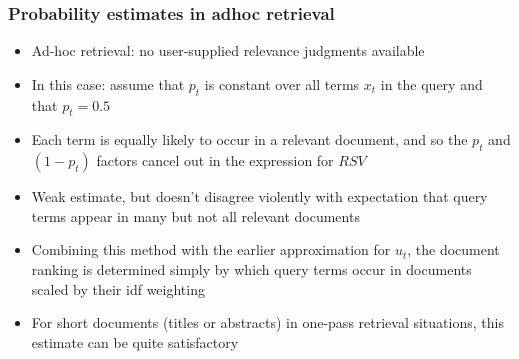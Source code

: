 \documentclass[compress]{beamer}
\begin{document}
\begin{frame}[<+->]
\frametitle{Probability estimates in adhoc retrieval}
\pause[2]

\begin{itemize}
\item Ad-hoc retrieval: no user-supplied relevance judgments available
\item In this case: assume that $p_t$ is constant over all terms $x_t$ in the query and that $p_t = 0.5$ 
\item Each term is equally likely to occur in a relevant document, and so the $p_t$ and $(1-p_t)$ factors cancel out in the expression for $RSV$ 

\item Weak estimate, but doesn't disagree violently with expectation that query terms appear in many but not all relevant documents

\item Combining this method with the earlier approximation for $u_t$, the document ranking is determined simply by which query terms occur in documents scaled by their idf weighting 

\item For short documents (titles or abstracts) in one-pass retrieval situations, this estimate can be quite satisfactory
\end{itemize}
\end{frame}
\end{document}
